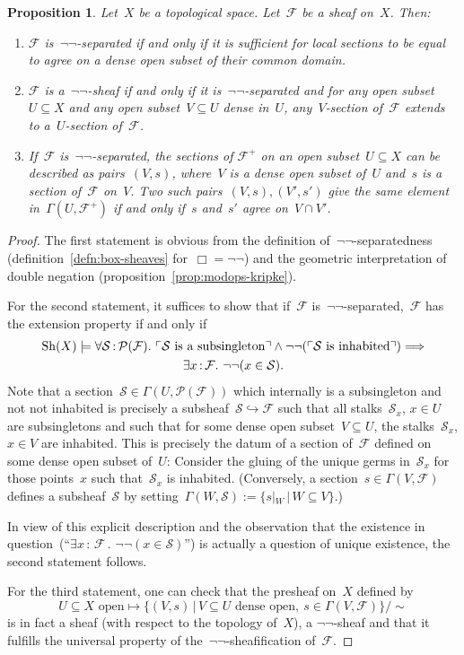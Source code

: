 \documentclass[10pt]{amsart}
\theoremstyle{definition}
\theoremstyle{plain}
\newtheorem{prop}[defn]{Proposition}
\theoremstyle{remark}
\newcommand{\F}{\mathcal{F}}
\renewcommand{\P}{\mathcal{P}}
\renewcommand{\S}{\mathcal{S}}
\newcommand{\Sh}{\mathrm{Sh}}
\newcommand{\?}{\,{:}\,}
\renewcommand{\_}{\mathpunct{.}\,}
\newcommand{\speak}[1]{\ulcorner\text{\textnormal{#1}}\urcorner}
\begin{document}
\begin{prop}Let~$X$ be a topological space. Let~$\F$ be a sheaf on~$X$. Then:
\begin{enumerate}
\item $\F$ is~$\neg\neg$-separated if and only if it is sufficient for local
sections to be equal to agree on a dense open subset of their common domain.
\item $\F$ is a~$\neg\neg$-sheaf if and only if it is~$\neg\neg$-separated and
for any open subset~$U \subseteq X$ and any open subset~$V \subseteq U$ dense
in~$U$, any~$V$-section of~$\F$ extends to a~$U$-section of~$\F$.
\item If~$\F$ is~$\neg\neg$-separated, the sections of $\F^+$ on an open
subset~$U \subseteq X$ can be described as pairs~$(V,s)$, where~$V$ is a dense
open subset of~$U$ and~$s$ is a section of~$\F$ on~$V$. Two such pairs~$(V,s),
(V',s')$ give the same element in~$\Gamma(U,\F^+)$ if and only if~$s$ and~$s'$
agree on~$V \cap V'$.
\end{enumerate}
\end{prop}
\begin{proof}
The first statement is obvious from the definition of~$\neg\neg$-separatedness
(definition~\ref{defn:box-sheaves} for~$\Box = \neg\neg$) and the geometric
interpretation of double negation (proposition~\ref{prop:modops-kripke}).

For the second statement, it suffices to show that if~$\F$
is~$\neg\neg$-separated,~$\F$ has the extension property if and only if
\begin{multline*}
  \Sh(X) \models \forall \S \? \P(\F)\_
  \speak{$\S$ is a subsingleton} \wedge
  \neg\neg(\speak{$\S$ is inhabited}) \Longrightarrow \\
  \exists x\?\F\_ \neg\neg(x \in \S).
\end{multline*}
Note that a section~$\S \in \Gamma(U,\P(\F))$ which internally is a
subsingleton and not not inhabited is precisely a subsheaf~$\S \hookrightarrow
\F$ such that all stalks~$\S_x$, $x \in U$ are subsingletons and such that for
some dense open subset~$V \subseteq U$, the stalks~$\S_x$, $x \in V$ are
inhabited. This is precisely the datum of a section of~$\F$ defined on some
dense open subset of~$U$: Consider the gluing of the unique germs in~$\S_x$ for
those points~$x$ such that~$\S_x$ is inhabited. (Conversely, a section~$s \in
\Gamma(V,\F)$ defines a subsheaf~$\S$ by setting~$\Gamma(W,\S) := \{ s|_W \,|\,
W \subseteq V \}$.)

In view of this explicit description and the observation that the existence in
question~(``$\exists x\?\F\_ \neg\neg(x \in \S)$'') is actually a question of
unique existence, the second statement follows.

For the third statement, one can check that the presheaf on~$X$ defined by
\[ \text{$U \subseteq X$ open} \longmapsto
  \{ (V,s) \,|\, \text{$V \subseteq U$ dense open},\ s \in \Gamma(V,\F)
  \}/{\sim} \]
is in fact a sheaf (with respect to the topology of~$X$), a $\neg\neg$-sheaf
and that it fulfills the universal property of the~$\neg\neg$-sheafification
of~$\F$.
\end{proof}
\end{document}
